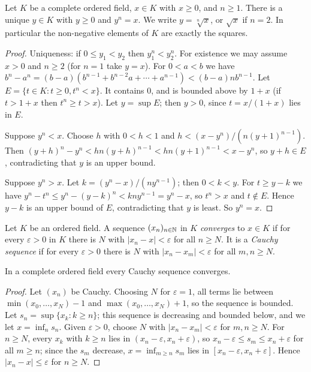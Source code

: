 \begin{proposition}\label{number-systems:proposition-roots}
Let $K$ be a complete ordered field, $x \in K$ with $x \geq 0$, and $n \geq 1$. There
is a unique $y \in K$ with $y \geq 0$ and $y^n = x$. We write $y = \sqrt[n]{x}$, or
$\sqrt{x}$ if $n = 2$. In particular the non-negative elements of $K$ are exactly
the squares.
\end{proposition}

\begin{proof}
Uniqueness: if $0 \leq y_1 < y_2$ then $y_1^n < y_2^n$. For existence we may assume
$x > 0$ and $n \geq 2$ (for $n = 1$ take $y = x$). For $0 < a < b$ we have
$b^n - a^n = (b - a)(b^{n-1} + b^{n-2}a + \cdots + a^{n-1}) < (b - a) n b^{n-1}$.
Let $E = \{t \in K : t \geq 0, t^n < x\}$. It contains $0$, and is bounded above
by $1 + x$ (if $t > 1 + x$ then $t^n \geq t > x$). Let $y = \sup E$; then $y > 0$,
since $t = x/(1 + x)$ lies in $E$.

Suppose $y^n < x$. Choose $h$ with $0 < h < 1$ and
$h < (x - y^n)/(n (y + 1)^{n-1})$. Then
$(y + h)^n - y^n < h n (y + h)^{n-1} < h n (y+1)^{n-1} < x - y^n$, so
$y + h \in E$, contradicting that $y$ is an upper bound.

Suppose $y^n > x$. Let $k = (y^n - x)/(n y^{n-1})$; then $0 < k < y$. For
$t \geq y - k$ we have $y^n - t^n \leq y^n - (y - k)^n < k n y^{n-1} = y^n - x$, so
$t^n > x$ and $t \notin E$. Hence $y - k$ is an upper bound of $E$, contradicting
that $y$ is least. So $y^n = x$.
\end{proof}

\begin{definition}\label{number-systems:definition-cauchy}
Let $K$ be an ordered field. A sequence $(x_n)_{n \in \mathbb{N}}$ in $K$
\emph{converges} to $x \in K$ if for every $\varepsilon > 0$ in $K$ there is $N$
with $|x_n - x| < \varepsilon$ for all $n \geq N$. It is a \emph{Cauchy sequence}
if for every $\varepsilon > 0$ there is $N$ with $|x_n - x_m| < \varepsilon$ for
all $m, n \geq N$.
\end{definition}

\begin{proposition}\label{number-systems:proposition-cauchy-complete}
In a complete ordered field every Cauchy sequence converges.
\end{proposition}

\begin{proof}
Let $(x_n)$ be Cauchy. Choosing $N$ for $\varepsilon = 1$, all terms lie between
$\min(x_0, \ldots, x_N) - 1$ and $\max(x_0, \ldots, x_N) + 1$, so the sequence is
bounded. Let $s_n = \sup\{x_k : k \geq n\}$; this sequence is decreasing and
bounded below, and we let $x = \inf_n s_n$. Given $\varepsilon > 0$, choose $N$
with $|x_n - x_m| < \varepsilon$ for $m, n \geq N$. For $n \geq N$, every
$x_k$ with $k \geq n$ lies in $(x_n - \varepsilon, x_n + \varepsilon)$, so
$x_n - \varepsilon \leq s_m \leq x_n + \varepsilon$ for all $m \geq n$; since the
$s_m$ decrease, $x = \inf_{m \geq n} s_m$ lies in
$[x_n - \varepsilon, x_n + \varepsilon]$. Hence $|x_n - x| \leq \varepsilon$ for
$n \geq N$.
\end{proof}

